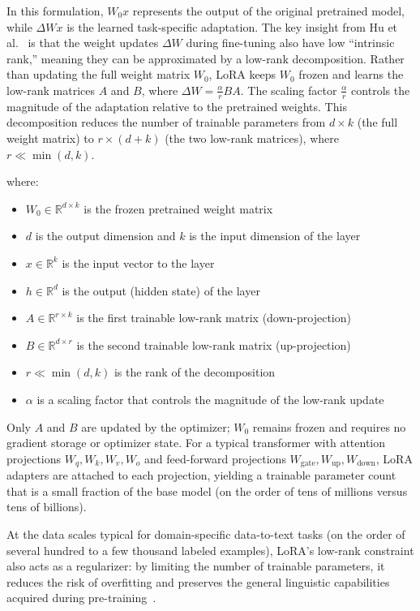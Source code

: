 In this formulation, $W_0 x$ represents the output of the original pretrained model, while $\Delta W x$ is the learned task-specific adaptation. The key insight from Hu et al.~\cite{hu2021lora} is that the weight updates $\Delta W$ during fine-tuning also have low ``intrinsic rank,'' meaning they can be approximated by a low-rank decomposition. Rather than updating the full weight matrix $W_0$, LoRA keeps $W_0$ frozen and learns the low-rank matrices $A$ and $B$, where $\Delta W = \frac{\alpha}{r} BA$. The scaling factor $\frac{\alpha}{r}$ controls the magnitude of the adaptation relative to the pretrained weights. This decomposition reduces the number of trainable parameters from $d \times k$ (the full weight matrix) to $r \times (d + k)$ (the two low-rank matrices), where $r \ll \min(d, k)$.

where:
\begin{itemize}
  \item $W_0 \in \mathbb{R}^{d \times k}$ is the frozen pretrained weight matrix
  \item $d$ is the output dimension and $k$ is the input dimension of the layer
  \item $x \in \mathbb{R}^k$ is the input vector to the layer
  \item $h \in \mathbb{R}^d$ is the output (hidden state) of the layer
  \item $A \in \mathbb{R}^{r \times k}$ is the first trainable low-rank matrix (down-projection)
  \item $B \in \mathbb{R}^{d \times r}$ is the second trainable low-rank matrix (up-projection)
  \item $r \ll \min(d, k)$ is the rank of the decomposition
  \item $\alpha$ is a scaling factor that controls the magnitude of the low-rank update
\end{itemize}
Only $A$ and $B$ are updated by the optimizer; $W_0$ remains frozen and requires no gradient storage or optimizer state. For a typical transformer with attention projections $W_q, W_k, W_v, W_o$ and feed-forward projections $W_{\mathrm{gate}}, W_{\mathrm{up}}, W_{\mathrm{down}}$, LoRA adapters are attached to each projection, yielding a trainable parameter count that is a small fraction of the base model (on the order of tens of millions versus tens of billions).

At the data scales typical for domain-specific data-to-text tasks (on the order of several hundred to a few thousand labeled examples), LoRA's low-rank constraint also acts as a regularizer: by limiting the number of trainable parameters, it reduces the risk of overfitting and preserves the general linguistic capabilities acquired during pre-training~\cite{hu2021lora}.

